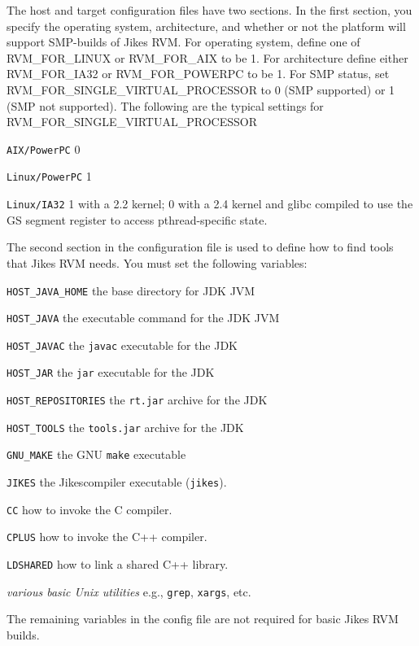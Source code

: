 \begin{enumerate}
The host and target configuration files have two sections.  In the
first section, you specify the operating system, architecture, and
whether or not the platform will support SMP-builds of Jikes RVM. 
For operating system, define one of RVM\_FOR\_LINUX or RVM\_FOR\_AIX
to be 1.  For architecture define either
RVM\_FOR\_IA32 or RVM\_FOR\_POWERPC to be 1.  For SMP status, set
RVM\_FOR\_SINGLE\_VIRTUAL\_PROCESSOR to 0 (SMP supported) or 1 (SMP not
supported).  The following are the typical settings for
RVM\_FOR\_SINGLE\_VIRTUAL\_PROCESSOR 
\begin{description}
\item {\tt AIX/PowerPC} 0 
\item {\tt Linux/PowerPC} 1 
\item {\tt Linux/IA32} 1 with a 2.2 kernel; 
0 with a 2.4 kernel and glibc compiled to use the GS
segment register to access pthread-specific state.
\end{description}                
The second section in the configuration file is used to define how to
find tools that Jikes RVM needs. You must set the following variables:
\begin{description}
\item {\tt HOST\_JAVA\_HOME} the base directory for JDK JVM
\item {\tt HOST\_JAVA} the executable command for the JDK JVM
\item {\tt HOST\_JAVAC} the {\tt javac} executable for the JDK  
\item {\tt HOST\_JAR} the {\tt jar} executable for the JDK  
\item {\tt HOST\_REPOSITORIES} the {\tt rt.jar} archive for the JDK  
\item {\tt HOST\_TOOLS} the {\tt tools.jar} archive for the JDK  
\item {\tt GNU\_MAKE} the GNU {\tt make} executable
\item {\tt JIKES} the Jikes\trademark compiler executable ({\tt jikes}).
\item {\tt CC} how to invoke the C compiler.
\item {\tt CPLUS} how to invoke the C++ compiler.
\item {\tt LDSHARED} how to link a shared C++ library.
\item {\em various basic Unix utilities} e.g., {\tt grep}, {\tt xargs}, etc.
\end{description}
The remaining variables in the config file are not required for basic
Jikes RVM
builds.


\end{enumerate}

